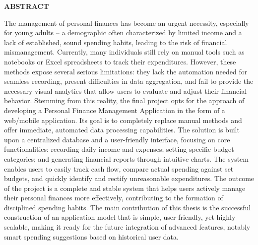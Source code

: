 \documentclass[../DoAn.tex]{subfiles}
\begin{document}
\begin{center}
    \Large{\textbf{ABSTRACT}}\\
\end{center}
\vspace{1cm}
The management of personal finances has become an urgent necessity, especially for young adults – a demographic often characterized by limited income and a lack of established, sound spending habits, leading to the risk of financial mismanagement. Currently, many individuals still rely on manual tools such as notebooks or Excel spreadsheets to track their expenditures. However, these methods expose several serious limitations: they lack the automation needed for seamless recording, present difficulties in data aggregation, and fail to provide the necessary visual analytics that allow users to evaluate and adjust their financial behavior. Stemming from this reality, the final project opts for the approach of developing a Personal Finance Management Application in the form of a web/mobile application. Its goal is to completely replace manual methods and offer immediate, automated data processing capabilities. The solution is built upon a centralized database and a user-friendly interface, focusing on core functionalities: recording daily income and expenses; setting specific budget categories; and generating financial reports through intuitive charts. The system enables users to easily track cash flow, compare actual spending against set budgets, and quickly identify and rectify unreasonable expenditures. The outcome of the project is a complete and stable system that helps users actively manage their personal finances more effectively, contributing to the formation of disciplined spending habits. The main contribution of this thesis is the successful construction of an application model that is simple, user-friendly, yet highly scalable, making it ready for the future integration of advanced features, notably smart spending suggestions based on historical user data.
\end{document}
